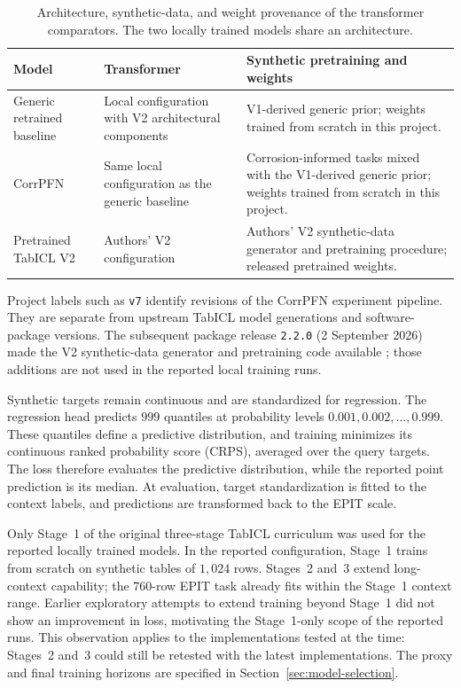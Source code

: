\documentclass{article}
\begin{document}
\begin{table}[htbp]
\centering
\caption{Architecture, synthetic-data, and weight provenance of the transformer
comparators. The two locally trained models share an architecture.}
\label{tab:model-provenance}
\begin{tabularx}{\linewidth}{@{}lLL@{}}
\toprule
Model & Transformer & Synthetic pretraining and weights \\
\midrule
Generic retrained baseline
& Local configuration with V2 architectural components
& V1-derived generic prior; weights trained from scratch in this project. \\
CorrPFN
& Same local configuration as the generic baseline
& Corrosion-informed tasks mixed with the V1-derived generic prior; weights
trained from scratch in this project. \\
Pretrained TabICL V2
& Authors' V2 configuration
& Authors' V2 synthetic-data generator and pretraining procedure; released
pretrained weights. \\
\bottomrule
\end{tabularx}
\end{table}

Project labels such as \texttt{v7} identify revisions of the CorrPFN experiment
pipeline. They are separate from upstream TabICL model generations and
software-package versions. The subsequent package release \texttt{2.2.0}
(2 September 2026) made the V2 synthetic-data generator and pretraining code
available \cite{tabicl220release}; those additions are not used in the
reported local training runs.

Synthetic targets remain continuous and are standardized for regression.
The regression head predicts \(999\) quantiles at probability levels
\(0.001,0.002,\ldots,0.999\). These quantiles define a predictive distribution,
and training minimizes its continuous ranked probability score (CRPS),
averaged over the query targets. The loss therefore evaluates the predictive
distribution, while the reported point prediction is its median. At
evaluation, target standardization is fitted to the context labels, and
predictions are transformed back to the EPIT scale.

Only Stage~1 of the original three-stage TabICL curriculum was used for the
reported locally trained models. In the reported configuration, Stage~1
trains from scratch on synthetic tables of \(1{,}024\) rows. Stages~2 and~3
extend long-context capability; the \(760\)-row EPIT task already fits within
the Stage~1 context range. Earlier exploratory attempts to extend training
beyond Stage~1 did not show an improvement in loss, motivating the
Stage~1-only scope of the reported runs. This observation applies to the
implementations tested at the time: Stages~2 and~3 could still be retested
with the latest implementations. The proxy and final training horizons are
specified in Section~\ref{sec:model-selection}.
\end{document}
